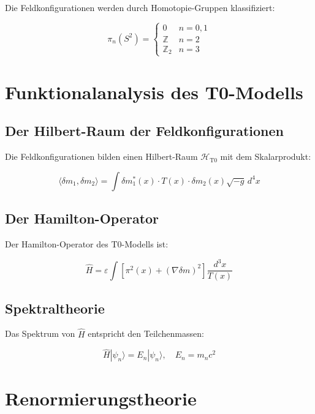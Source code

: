 \documentclass[12pt,a4paper]{report}
\begin{document}
	Die Feldkonfigurationen werden durch Homotopie-Gruppen klassifiziert:
	
	\begin{equation}
		\pi_n(S^2) = \begin{cases}
			0 & n = 0, 1 \\
			\mathbb{Z} & n = 2 \\
			\mathbb{Z}_2 & n = 3
		\end{cases}
	\end{equation}
	
	\section{Funktionalanalysis des T0-Modells}
	
	\subsection{Der Hilbert-Raum der Feldkonfigurationen}
	
	Die Feldkonfigurationen bilden einen Hilbert-Raum $\mathcal{H}_{\text{T0}}$ mit dem Skalarprodukt:
	
	\begin{equation}
		\langle\delta m_1, \delta m_2\rangle = \int \delta m_1^*(x) \cdot T(x) \cdot \delta m_2(x) \sqrt{-g} \, d^4x
	\end{equation}
	
	\subsection{Der Hamilton-Operator}
	
	Der Hamilton-Operator des T0-Modells ist:
	
	\begin{equation}
		\hat{H} = \varepsilon \int [\pi^2(x) + (\nabla\delta m)^2] \frac{d^3x}{T(x)}
	\end{equation}
	
	\subsection{Spektraltheorie}
	
	Das Spektrum von $\hat{H}$ entspricht den Teilchenmassen:
	
	\begin{equation}
		\hat{H}|\psi_n\rangle = E_n|\psi_n\rangle, \quad E_n = m_n c^2
	\end{equation}
	
	\section{Renormierungstheorie}
	
\end{document}
